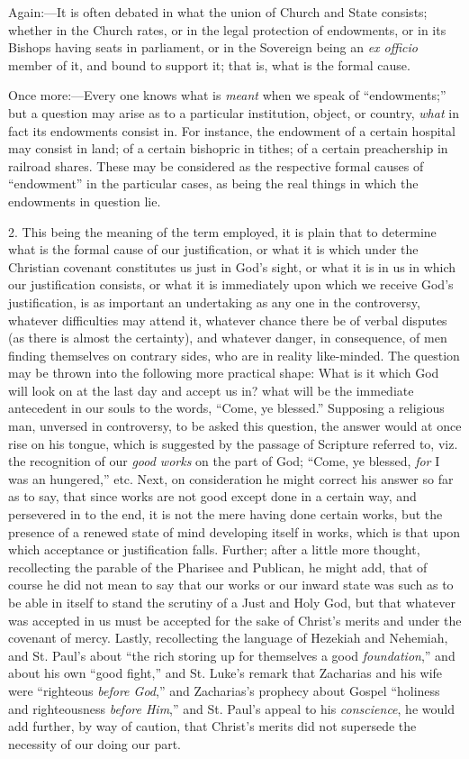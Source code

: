 Again:—It is often debated in what the union of Church and
State consists; whether in the Church rates, or in the legal
protection of endowments, or in its Bishops having seats in
parliament, or in the Sovereign being an \emph{ex officio} member of
it, and bound to support it; that is, what is the formal cause.

Once more:—Every one knows what is \emph{meant} when we speak of
``endowments;'' but a question may arise as to a particular
institution, object, or country, \emph{what} in fact its endowments
consist in. For instance, the endowment of a certain hospital may
consist in land; of a certain bishopric in tithes; of a certain
preachership in railroad shares. These may be considered as the
respective formal causes of ``endowment'' in the particular
cases, as being the real things in which the endowments in question
lie.

2. This being the meaning of the term employed, it is plain that to
determine what is the formal cause of our justification, or what it is
which under the Christian covenant constitutes us just in God's sight,
or what it is in us in which our justification consists, or what it is
immediately upon which we receive God's justification, is as important
an undertaking as any one in the controversy, whatever difficulties
may attend it, whatever chance there be of verbal disputes (as there
is almost the certainty), and whatever danger, in consequence, of men
finding themselves on contrary sides, who are in reality like-minded.
The question may be thrown into the following more practical shape:
What is it which God will look on at the last day and accept us in?
what will be the immediate antecedent in our souls to the words,
``Come, ye blessed.'' Supposing a religious man, unversed in
controversy, to be asked this question, the answer would at once rise
on his tongue, which is suggested by the passage of Scripture referred
to, viz. the recognition of our \emph{good works} on the part of God;
``Come, ye blessed, \emph{for} I was an hungered,'' etc. Next,
on consideration he might correct his answer so far as to say, that
since works are not good except done in a certain way, and persevered in to the end, it is not the mere having done certain
works, but the presence of a renewed state of mind developing itself
in works, which is that upon which acceptance or justification falls.
Further; after a little more thought, recollecting the parable of the
Pharisee and Publican, he might add, that of course he did not mean to
say that our works or our inward state was such as to be able in
itself to stand the scrutiny of a Just and Holy God, but that whatever
was accepted in us must be accepted for the sake of Christ's merits
and under the covenant of mercy. Lastly, recollecting the language of
Hezekiah and Nehemiah, and St. Paul's about ``the rich storing up
for themselves a good \emph{foundation},'' and about his own
``good fight,'' and St. Luke's remark that Zacharias and his
wife were ``righteous \emph{before God},'' and Zacharias's
prophecy about Gospel ``holiness and righteousness \emph{before Him},''
and St. Paul's appeal to his \emph{conscience}, he would add further,
by way of caution, that Christ's merits did not supersede the
necessity of our doing our part.


